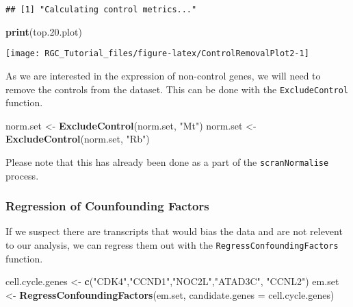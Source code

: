 \documentclass[]{article}
\newenvironment{Shaded}{\begin{snugshade}}{\end{snugshade}}
\newcommand{\DataTypeTok}[1]{\textcolor[rgb]{0.13,0.29,0.53}{#1}}
\newcommand{\FloatTok}[1]{\textcolor[rgb]{0.00,0.00,0.81}{#1}}
\newcommand{\KeywordTok}[1]{\textcolor[rgb]{0.13,0.29,0.53}{\textbf{#1}}}
\newcommand{\NormalTok}[1]{#1}
\newcommand{\StringTok}[1]{\textcolor[rgb]{0.31,0.60,0.02}{#1}}
\begin{document}
\begin{verbatim}
## [1] "Calculating control metrics..."
\end{verbatim}

\begin{Shaded}
\begin{Highlighting}[]
\KeywordTok{print}\NormalTok{(top.}\FloatTok{20.}\NormalTok{plot)}
\end{Highlighting}
\end{Shaded}

\begin{center}\texttt{[image: RGC\_Tutorial\_files/figure-latex/ControlRemovalPlot2-1]} \end{center}

As we are interested in the expression of non-control genes, we will
need to remove the controls from the dataset. This can be done with the
\texttt{ExcludeControl} function.

\begin{Shaded}
\begin{Highlighting}[]
\NormalTok{norm.set <-}\StringTok{ }\KeywordTok{ExcludeControl}\NormalTok{(norm.set, }\StringTok{"Mt"}\NormalTok{)}
\NormalTok{norm.set <-}\StringTok{ }\KeywordTok{ExcludeControl}\NormalTok{(norm.set, }\StringTok{"Rb"}\NormalTok{)}
\end{Highlighting}
\end{Shaded}

Please note that this has already been done as a part of the
\texttt{scranNormalise} process.

\hypertarget{regression-of-counfounding-factors}{%
\subsubsection{Regression of Counfounding
Factors}\label{regression-of-counfounding-factors}}

If we suspect there are transcripts that would bias the data and are not
relevent to our analysis, we can regress them out with the
\texttt{RegressConfoundingFactors} function.

\begin{Shaded}
\begin{Highlighting}[]
\NormalTok{cell.cycle.genes <-}\StringTok{ }\KeywordTok{c}\NormalTok{(}\StringTok{"CDK4"}\NormalTok{,}\StringTok{"CCND1"}\NormalTok{,}\StringTok{"NOC2L"}\NormalTok{,}\StringTok{"ATAD3C"}\NormalTok{, }\StringTok{"CCNL2"}\NormalTok{)}
\NormalTok{em.set <-}\StringTok{ }\KeywordTok{RegressConfoundingFactors}\NormalTok{(em.set, }\DataTypeTok{candidate.genes =}\NormalTok{ cell.cycle.genes)}
\end{Highlighting}
\end{Shaded}
\end{document}
